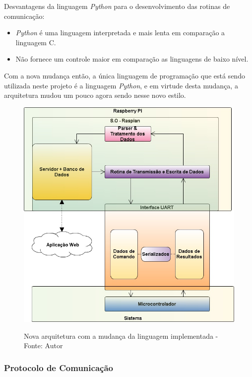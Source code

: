 Desvantagens da linguagem \textit{Python} para o desenvolvimento das rotinas de comunicação:

\begin{itemize}
    \item \textit{Python} é uma linguagem interpretada e mais lenta em comparação a linguagem C.
    \item Não fornece um controle maior em comparação as linguagens de baixo nível.
\end{itemize}

Com a nova mudança então, a única linguagem de programação que está sendo utilizada neste projeto é a linguagem \textit{Python}, e em virtude 
desta mudança, a arquitetura mudou um pouco agora sendo nesse novo estilo.

\begin{figure}[H]
\centering
\includegraphics[keepaspectratio=true,scale=0.7]{figuras/nova_arquitetura.png}
\label{fig:nova_arquitetura}
\caption{Nova arquitetura com a mudança da linguagem implementada - Fonte: Autor}
\end{figure}

\subsubsection*{\textbf{Protocolo de Comunicação}}


